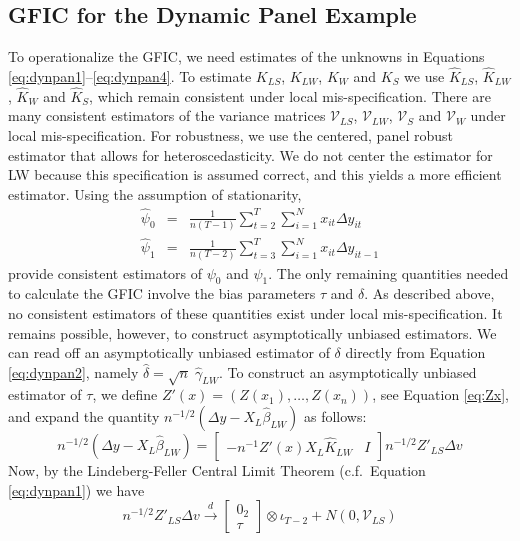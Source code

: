 \subsection{GFIC for the Dynamic Panel Example}
To operationalize the GFIC, we need estimates of the unknowns in Equations \ref{eq:dynpan1}--\ref{eq:dynpan4}.
To estimate $K_{LS}$, $K_{LW}$, $K_W$ and $K_S$ we use $\widehat{K}_{LS}$, $\widehat{K}_{LW}$, $\widehat{K}_W$ and $\widehat{K}_S$, which remain consistent under local mis-specification. 
There are many consistent estimators of the variance matrices $\mathcal{V}_{LS}$, $\mathcal{V}_{LW}$, $\mathcal{V}_{S}$ and $\mathcal{V}_{W}$ under local mis-specification. 
For robustness, we use the centered, panel robust estimator that allows for heteroscedasticity. 
We do not center the estimator for LW because this specification is assumed correct, and this yields a more efficient estimator. 
Using the assumption of stationarity, 
	\begin{eqnarray*}
		\widehat{\psi}_0 &=&\frac{1}{n(T-1)} \sum_{t=2}^T\sum_{i=1}^N x_{it} \Delta y_{it}\\
		\widehat{\psi}_1 &=&\frac{1}{n(T-2)} \sum_{t=3}^T\sum_{i=1}^N x_{it} \Delta y_{it-1}
	\end{eqnarray*}
provide consistent estimators of $\psi_0$ and $\psi_1$.
The only remaining quantities needed to calculate the GFIC involve the bias parameters $\tau$ and $\delta$.
As described above, no consistent estimators of these quantities exist under local mis-specification.
It remains possible, however, to construct asymptotically unbiased estimators.
We can read off an asymptotically unbiased estimator of $\delta$ directly from Equation \ref{eq:dynpan2}, namely $\widehat{\delta} = \sqrt{n}\; \widehat{\gamma}_{LW}$.
To construct an asymptotically unbiased estimator of $\tau$, we define $Z'(x) = \left(Z(x_1), \hdots, Z(x_n)\right)$, see Equation \ref{eq:Zx}, and expand the quantity $n^{-1/2}(\Delta y -X_L\widehat{\beta}_{LW})$ as follows:
$$n^{-1/2}(\Delta y -X_L\widehat{\beta}_{LW}) = \left[\begin{array}{cc} -n^{-1} Z'(x)X_L \widehat{K}_{LW}& I \end{array} \right]n^{-1/2} Z'_{LS}\Delta v$$
Now, by the Lindeberg-Feller Central Limit Theorem (c.f.\ Equation \ref{eq:dynpan1}) we have
$$n^{-1/2} Z'_{LS}\Delta v \overset{d}{\rightarrow}\left[\begin{array}{c}0_2\\ \tau \end{array}\right]\otimes \iota_{T-2} + N\left(0, \mathcal{V}_{LS}\right)$$
